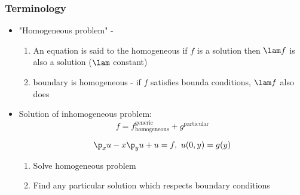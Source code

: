 \documentclass[Maths.tex]{subfiles}
\begin{document}
\subsection{Terminology}
\begin{itemize}
	\item "Homogeneous problem" -
	\begin{enumerate}
		\item An equation is said to the homogeneous if $f$ is a solution then $\lam f$ is also a solution ($\lam$ constant)
		\item boundary is homogeneous - if $f$ satisfies bounda conditions, $\lam f$ also does
	\end{enumerate}
	\item Solution of inhomogeneous problem:
	\begin{equation}
		f = f_{\text{homogeneous}}^{\text{generic}} + g^{\text{particular}}
	\end{equation}
	\begin{example}
	\begin{equation}
		\p_xu - x\p_yu + u = f,~ u(0,y) = g(y)
	\end{equation}
	\begin{enumerate}
		\item Solve homogeneous problem
		\item Find any particular solution which respects boundary conditions
	\end{enumerate}
	\end{example}
\end{itemize}

\chapter{}
\end{document}
